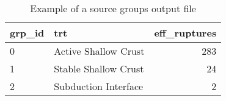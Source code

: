 \begin{table}[htbp]
\centering
\begin{tabular}{llr}

\hline
\rowcolor{lightgray}
\bf{grp_id} & \bf{trt} & \bf{eff_ruptures} \\
\hline
0 & Active Shallow Crust & 283 \\
1 & Stable Shallow Crust & 24 \\
2 & Subduction Interface & 2 \\
\hline

\end{tabular}
\caption{Example of a source groups output file}
\label{output:event_based_sourcegroups}
\end{table}